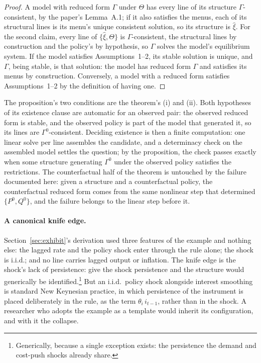 \documentclass[11pt]{article}
\theoremstyle{remark}
\begin{document}
\begin{proof}
A model with reduced form $\Gamma$ under $\Theta$ has every line of its structure $\Gamma$-consistent, by the paper's Lemma~A.1; if it also satisfies the menus, each of its structural lines is its menu's unique consistent solution, so its structure is $\hat\xi$. For the second claim, every line of $\{\hat\xi,\Theta\}$ is $\Gamma$-consistent, the structural lines by construction and the policy's by hypothesis, so $\Gamma$ solves the model's equilibrium system. If the model satisfies Assumptions~1--2, its stable solution is unique, and $\Gamma$, being stable, is that solution: the model has reduced form $\Gamma$ and satisfies its menus by construction. Conversely, a model with a reduced form satisfies Assumptions~1--2 by the definition of having one.
\end{proof}

The proposition's two conditions are the theorem's (i) and (ii). Both hypotheses of its existence clause are automatic for an observed pair: the observed reduced form is stable, and the observed policy is part of the model that generated it, so its lines are $\Gamma^0$-consistent. Deciding existence is then a finite computation: one linear solve per line assembles the candidate, and a determinacy check on the assembled model settles the question; by the proposition, the check passes exactly when some structure generating $\Gamma^0$ under the observed policy satisfies the restrictions. The counterfactual half of the theorem is untouched by the failure documented here: given a structure and a counterfactual policy, the counterfactual reduced form comes from the same nonlinear step that determined $\{P^0,Q^0\}$, and the failure belongs to the linear step before it.

\paragraph{A canonical knife edge.}
Section~\ref{sec:exhibit}'s derivation used three features of the example and nothing else: the lagged rate and the policy shock enter through the rule alone; the shock is i.i.d.; and no line carries lagged output or inflation. The knife edge is the shock's lack of persistence: give the shock persistence and the structure would generically be identified.\footnote{Generically, because a single exception exists: the persistence the demand and cost-push shocks already share.} But an i.i.d.\ policy shock alongside interest smoothing is standard New Keynesian practice, in which persistence of the instrument is placed deliberately in the rule, as the term $\theta_i\,i_{t-1}$, rather than in the shock. A researcher who adopts the example as a template would inherit its configuration, and with it the collapse.
\end{document}
